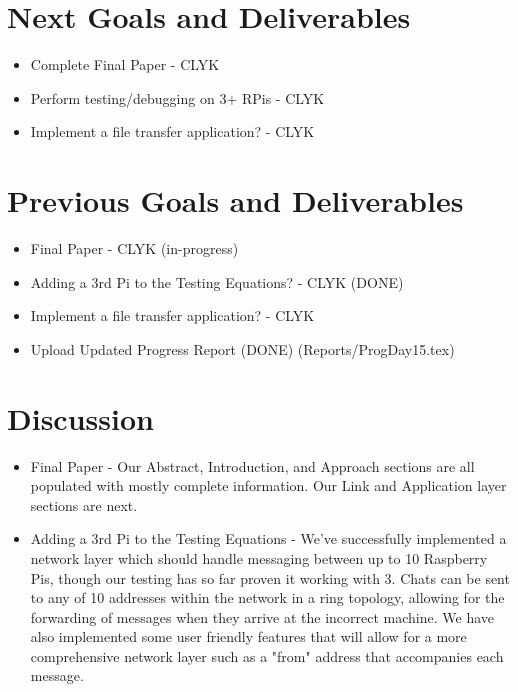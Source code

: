 \documentclass{article}
\begin{document}
\section*{Next Goals and Deliverables}
\begin{itemize}
\item Complete Final Paper - CLYK
\item Perform testing/debugging on 3+ RPis - CLYK
\item Implement a file transfer application? - CLYK
\end{itemize}
\section*{Previous Goals and Deliverables}
\begin{itemize}
\item Final Paper - CLYK (in-progress)
\item Adding a 3rd Pi to the Testing Equations? - CLYK (DONE)
\item Implement a file transfer application? - CLYK 

\item Upload Updated Progress Report (DONE) (Reports/ProgDay15.tex)
\end{itemize}
\section*{Discussion}
\begin{itemize}
\item Final Paper - Our Abstract, Introduction, and Approach sections are all populated with mostly complete information. Our Link and Application layer sections are next.
\item Adding a 3rd Pi to the Testing Equations - We've successfully implemented a network layer which should handle messaging between up to 10 Raspberry Pis, though our testing has so far proven it working with 3. Chats can be sent to any of 10 addresses within the network in a ring topology, allowing for the forwarding of messages when they arrive at the incorrect machine. We have also implemented some user friendly features that will allow for a more comprehensive network layer such as a "from" address that accompanies each message. 
\end{itemize}
\end{document}

